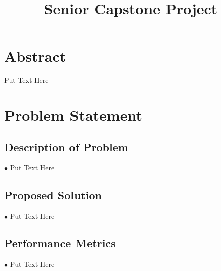 \documentclass[letterpaper,10pt,fleqn,draftclsnofoot,onecolumn]{IEEEtran}
\title{Senior Capstone Project}
\author{\name}
\begin{document}
	\maketitle
	\hrulefill
	\section*{Abstract}
	Put Text Here
	\newpage
	
	\section*{Problem Statement}
	
	\subsection{Description of Problem}
	$\bullet$ Put Text Here
	
	\subsection{Proposed Solution}
	$\bullet$ Put Text Here
	
	\subsection{Performance Metrics}
	$\bullet$ Put Text Here
	

	
\end{document}
